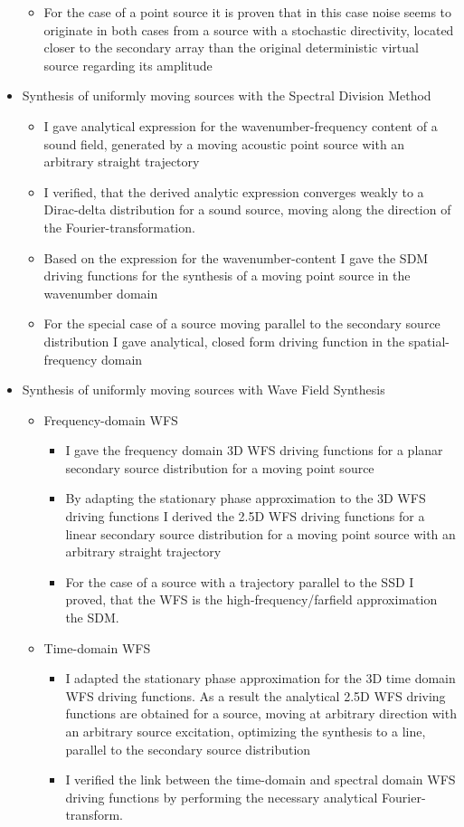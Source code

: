 \documentclass[a4paper,10pt]{article}
\begin{document}
\begin{itemize}
\begin{itemize}
	\item For the case of a point source it is proven that in this case noise seems to originate in both cases from a source with a stochastic directivity, located closer to the secondary array than the original deterministic virtual source regarding its amplitude
	\end{itemize}
	
\item Synthesis of uniformly moving sources with the Spectral Division Method
	\begin{itemize}
	\item I gave analytical expression for the wavenumber-frequency content of a sound field, generated by a moving acoustic point source with an arbitrary straight trajectory
	\item I verified, that the derived analytic expression converges weakly to a Dirac-delta distribution for a sound source, moving along the direction of the Fourier-transformation.
	\item Based on the expression for the wavenumber-content I gave the SDM driving functions for the synthesis of a moving point source in the wavenumber domain
	\item For the special case of a source moving parallel to the secondary source distribution I gave analytical, closed form driving function in the spatial-frequency domain
	\end{itemize}
\item Synthesis of uniformly moving sources with Wave Field Synthesis
	\begin{itemize}
	\item Frequency-domain WFS
		\begin{itemize}
		\item I gave the frequency domain 3D WFS driving functions for a planar secondary source distribution for a moving point source
		\item By adapting the stationary phase approximation to the 3D WFS driving functions I derived the 2.5D WFS driving functions for a linear secondary source distribution for a moving point source with an arbitrary straight trajectory
		\item For the case of a source with a trajectory parallel to the SSD I proved, that the WFS is the high-frequency/farfield approximation the SDM.
		\end{itemize}
	\item Time-domain WFS
		\begin{itemize}
		\item I adapted the stationary phase approximation for the 3D time domain WFS driving functions. As a result the analytical 2.5D WFS driving functions are obtained for a source, 	moving at arbitrary direction with an arbitrary source excitation, optimizing the synthesis to a line, parallel to the secondary source distribution
		\item I verified the link between the time-domain and spectral domain WFS driving functions by performing the necessary analytical Fourier-transform.
		\end{itemize}
	\end{itemize}
\end{itemize}
\end{document}
